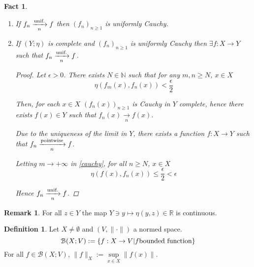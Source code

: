 \documentclass[12pt]{amsbook}
\newtheorem{fact}[theorem]{Fact}
\theoremstyle{definition}
\newtheorem{definition}[theorem]{Definition}
\newtheorem{remark}[theorem]{Remark}
\newcommand{\NN}{{\mathbb N}}
\newcommand{\RR}{{\mathbb R}}
\newcommand{\cB}{{\mathcal B}}
\newcommand{\ra}{\rightarrow} %
\begin{document}
\begin{fact} \
\begin{enumerate}
\item If $f_n \xrightarrow[n]{\textup{unif.}} f$ then $(f_n)_{n \geq 1}$ is uniformly Cauchy.

\item If $(Y; \eta)$ is complete and $(f_n)_{n \geq 1}$ is uniformly Cauchy then $\exists f: X \ra Y$ such that $f_n \xrightarrow[n]{\textup{unif.}} f$.

\begin{proof}
Let $\epsilon > 0$. There exists $N \in \NN$ such that for any $m, n \geq N$, $x \in X$ 
\begin{equation}
\eta(f_m(x), f_n(x)) < \frac{\epsilon}{2} \label{cauchy} \tag{$*$}
\end{equation}

Then, for each $x \in X$ $(f_n(x))_{n \geq 1}$ is Cauchy in $Y$ complete, hence there exists $f(x) \in Y$ such that $f_n(x) \xrightarrow[n]{} f(x)$.

Due to the uniqueness of the limit in $Y$, there exists a function $f: X \ra Y$ such that $f_n \xrightarrow[n]{\textup{pointwise}} f$.

Letting $m \ra +\infty$ in \eqref{cauchy}, for all $n \geq N$, $x \in X$
\begin{equation*}
\eta(f(x), f_n(x)) \leq \frac{\epsilon}{2} < \epsilon
\end{equation*}

Hence $f_n \xrightarrow[n]{\textup{unif.}} f$.
\end{proof}
\end{enumerate}
\end{fact}

\begin{remark}
For all $z \in Y$ the map $Y \ni y \mapsto \eta(y, z) \in \RR$ is continuous.
\end{remark}


\begin{definition}
Let $X \neq \emptyset$ and $(V, \|\cdot\|)$ a normed space. 
\begin{equation*}
\cB(X; V) := \left\{f : X \ra V | f \textup{bounded function} \right\}
\end{equation*}
For all $f \in \cB(X; V)$, $\|f\|_X := \underset{x \in X}\sup \|f(x)\|$.
\end{definition}
\end{document}
